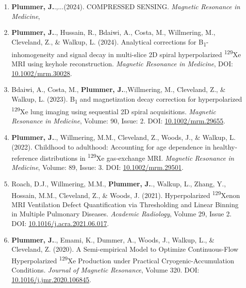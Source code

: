 \documentclass[12pt,]{scrartcl}
\begin{document}
\begin{enumerate}
  \leftskip-0.13in %
    \item  \textbf{Plummer, J.}.,...(2024). COMPRESSED SENSING. \textit{Magnetic Resonance in Medicine}, %
    
    \item  \textbf{Plummer, J.}., Hussain, R., Bdaiwi, A., Costa, M., Willmering, M., Cleveland, Z., \& Walkup, L. (2024). Analytical corrections for B\textsubscript{1}-inhomogeneity and signal decay in multi-slice 2D spiral hyperpolarized \textsuperscript{129}Xe MRI using keyhole reconstruction. \textit{Magnetic Resonance in Medicine}, %
    DOI: \href{https://doi.org/10.1002/mrm.30028}{10.1002/mrm.30028}.
    \item  Bdaiwi, A., Costa, M., \textbf{Plummer, J.}.,Willmering, M., Cleveland, Z., \& Walkup, L. (2023). B\textsubscript{1} and magnetization decay correction for hyperpolarized \textsuperscript{129}Xe lung imaging using sequential 2D spiral acquisitions. \textit{Magnetic Resonance in Medicine}, Volume: 90, Issue: 2. DOI: \href{ https://doi.org/10.1002/mrm.29655}{ 10.1002/mrm.29655}.
    \item \textbf{Plummer, J.}., Willmering, M.M., Cleveland, Z., Woods, J., \& Walkup, L. (2022). Childhood to adulthood: Accounting for age dependence in healthy‐reference distributions in \textsuperscript{129}Xe gas‐exchange MRI. \textit{Magnetic Resonance in Medicine}, Volume: 89, Issue: 3. DOI: \href{https://onlinelibrary.wiley.com/share/GVTXYDIF3Y2VPZRHQRIK?target=10.1002/mrm.29501}{10.1002/mrm.29501}.
    \item Roach, D.J., Willmering, M.M., \textbf{Plummer, J.}., Walkup, L., Zhang, Y., Hossain, M.M., Cleveland, Z., \& Woods, J. (2021). Hyperpolarized \textsuperscript{129}Xenon MRI Ventilation Defect Quantification via Thresholding and Linear Binning in Multiple Pulmonary Diseases. \textit{Academic Radiology}, Volume 29, Issue 2. DOI: \href{https://doi.org/10.1016/j.acra.2021.06.017}{10.1016/j.acra.2021.06.017}.
  \item \textbf{Plummer, J.}., Emami, K., Dummer, A., Woods, J., Walkup, L., \& Cleveland, Z. (2020). A Semi-empirical Model to Optimize Continuous-Flow Hyperpolarized \textsuperscript{129}Xe Production under Practical Cryogenic-Accumulation Conditions. \textit{Journal of Magnetic Resonance}, Volume 320. DOI: \href{https://doi.org/10.1016/j.jmr.2020.106845}{10.1016/j.jmr.2020.106845}.

\end{enumerate}
\end{document}
